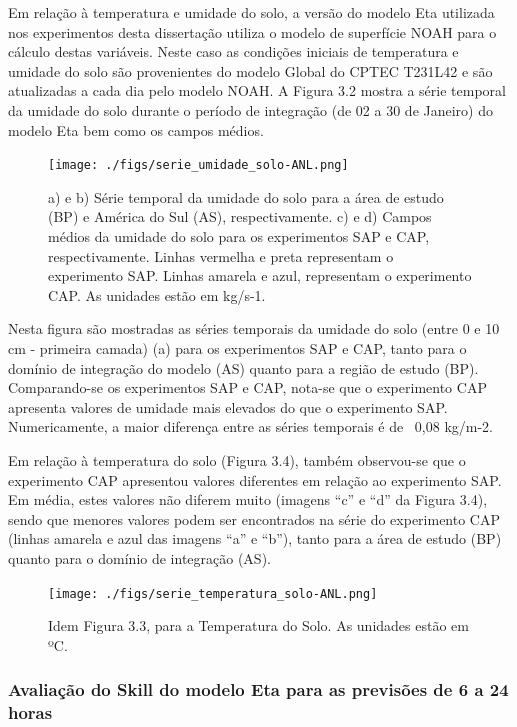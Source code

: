 Em relação à temperatura e umidade do solo, a versão do modelo Eta utilizada nos experimentos desta dissertação utiliza o modelo de superfície NOAH para o cálculo destas variáveis. Neste caso as condições iniciais de temperatura e umidade do solo são provenientes do modelo Global do CPTEC T231L42 e são atualizadas a cada dia pelo modelo NOAH. A Figura 3.2 mostra a série temporal da umidade do solo durante o período de integração (de 02 a 30 de Janeiro) do modelo Eta bem como os campos médios.

\begin{figure}[!hbp]
\centering
\texttt{[image: ./figs/serie\_umidade\_solo-ANL.png]}
\caption{a) e b) Série temporal da umidade do solo para a área de estudo (BP) e América do Sul (AS), respectivamente. c) e d) Campos médios da umidade do solo para os experimentos SAP e CAP, respectivamente. Linhas vermelha e preta representam o experimento SAP. Linhas amarela e azul, representam o experimento CAP. As unidades estão em kg/s-1.}
\label{fig53}
\end{figure}

Nesta figura são mostradas as séries temporais da umidade do solo (entre 0 e 10 cm - primeira camada) (a) para os experimentos SAP e CAP, tanto para o domínio de integração do modelo (AS) quanto para a região de estudo (BP). Comparando-se os experimentos SAP e CAP, nota-se que o experimento CAP apresenta valores de umidade mais elevados do que o experimento SAP. Numericamente, a maior diferença entre as séries temporais é de ~0,08 kg/m-2.

Em relação à temperatura do solo (Figura 3.4), também observou-se que o experimento CAP apresentou valores diferentes em relação ao experimento SAP. Em média, estes valores não diferem muito (imagens “c” e “d” da Figura 3.4), sendo que menores valores podem ser encontrados na série do experimento CAP (linhas amarela e azul das imagens “a” e “b”), tanto para a área de estudo (BP) quanto para o domínio de integração (AS).

\begin{figure}[!hbp]
\centering
\texttt{[image: ./figs/serie\_temperatura\_solo-ANL.png]}
\caption{Idem Figura 3.3, para a Temperatura do Solo. As unidades estão em ºC.}
\label{fig54}
\end{figure}

\subsubsection{Avaliação do Skill do modelo Eta para as previsões de 6 a 24 horas}

